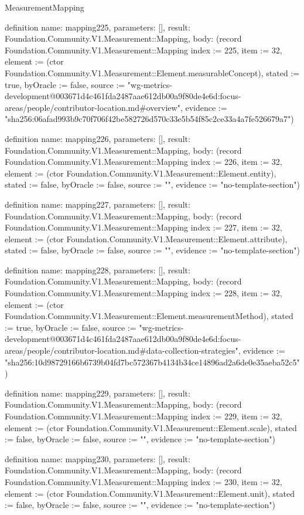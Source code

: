 \begin{lexlean}{MeasurementMapping}
\begin{semanticmodule}
definition{
  name: mapping225,
  parameters: [],
  result: Foundation.Community.V1.Measurement::Mapping,
  body: (record Foundation.Community.V1.Measurement::Mapping {index := 225, item := 32, element := (ctor Foundation.Community.V1.Measurement::Element.measurableConcept), stated := true, byOracle := false, source := "wg-metrics-development@003671d4c461fda2487aae612db00a9f80de4e6d:focus-areas/people/contributor-location.md#overview", evidence := "sha256:06afad993b9c70f706f42be582726d570c33e5b54f85c2ce33a4a7fe526679a7"})
}

definition{
  name: mapping226,
  parameters: [],
  result: Foundation.Community.V1.Measurement::Mapping,
  body: (record Foundation.Community.V1.Measurement::Mapping {index := 226, item := 32, element := (ctor Foundation.Community.V1.Measurement::Element.entity), stated := false, byOracle := false, source := "", evidence := "no-template-section"})
}

definition{
  name: mapping227,
  parameters: [],
  result: Foundation.Community.V1.Measurement::Mapping,
  body: (record Foundation.Community.V1.Measurement::Mapping {index := 227, item := 32, element := (ctor Foundation.Community.V1.Measurement::Element.attribute), stated := false, byOracle := false, source := "", evidence := "no-template-section"})
}

definition{
  name: mapping228,
  parameters: [],
  result: Foundation.Community.V1.Measurement::Mapping,
  body: (record Foundation.Community.V1.Measurement::Mapping {index := 228, item := 32, element := (ctor Foundation.Community.V1.Measurement::Element.measurementMethod), stated := true, byOracle := false, source := "wg-metrics-development@003671d4c461fda2487aae612db00a9f80de4e6d:focus-areas/people/contributor-location.md#data-collection-strategies", evidence := "sha256:10d98729166b6739b04fd7bc572367b4134b34ce14896ad2a6de0e35aeba52c5"})
}

definition{
  name: mapping229,
  parameters: [],
  result: Foundation.Community.V1.Measurement::Mapping,
  body: (record Foundation.Community.V1.Measurement::Mapping {index := 229, item := 32, element := (ctor Foundation.Community.V1.Measurement::Element.scale), stated := false, byOracle := false, source := "", evidence := "no-template-section"})
}

definition{
  name: mapping230,
  parameters: [],
  result: Foundation.Community.V1.Measurement::Mapping,
  body: (record Foundation.Community.V1.Measurement::Mapping {index := 230, item := 32, element := (ctor Foundation.Community.V1.Measurement::Element.unit), stated := false, byOracle := false, source := "", evidence := "no-template-section"})
}


\end{semanticmodule}
\end{lexlean}
